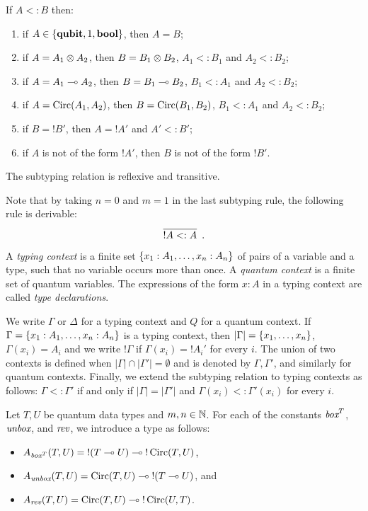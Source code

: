 \documentclass[twoside]{article}
\begin{document}
\begin{remark}
\label{subtyping_shape}
If $A<:B$ then:
\begin{enumerate}
  \item if $A\in\{\textrm{\bf qubit}, 1, \textrm{\bf bool}\}$, then $A=B$;
  \item if $A=A_1\otimes A_2$, then $B=B_1\otimes B_2$, 
  $A_1<:B_1$ and $A_2<:B_2$;
  \item if $A=A_1\multimap A_2$, then $B=B_1\multimap B_2$, 
  $B_1<:A_1$ and $A_2<:B_2$;
  \item if $A=\mathop{\textrm{Circ}}\nolimits(A_1, A_2)$, then $B=\mathop{\textrm{Circ}}\nolimits(B_1,B_2)$, 
  $B_1<:A_1$ and $A_2<:B_2$;
  \item if $B={!}B'$, then $A={!}A'$ and $A'<:B'$;\label{subtype_bang}
  \item if $A$ is not of the form ${!}A'$, then $B$ is not 
  of the form ${!}B'$.
\end{enumerate}
\end{remark}

\begin{proposition}
The subtyping relation is reflexive and transitive.
\end{proposition}

Note that by taking $n=0$ and $m=1$ in the last subtyping rule, the
following rule is derivable:
\[
  \infer[]{{!}A <: A}{}
  .
\]

\begin{definition}
A \emph{typing context} is a finite set 
$\{x_1:A_1,\ldots,x_n:A_n\}$ of pairs of a variable and 
a type, such that no variable occurs more than once. A 
\emph{quantum context} is a finite set of quantum variables. 
The expressions of the form $x:A$ in a typing context are 
called \emph{type declarations}.	
\end{definition}

We write $\Gamma$ or $\Delta$ for a typing context and $Q$ for 
a quantum context. If $\Gamma =\{x_1:A_1,\ldots,x_n:A_n\}$ is 
a typing context, then $|\Gamma|=\{x_1,\ldots,x_n\}$, 
$\Gamma (x_i)=A_i$ and we write ${!}\Gamma$ if $\Gamma(x_i)={!}A_i'$ 
for every $i$. The union of two contexts is defined when
$|\Gamma|\cap  |\Gamma'|=\emptyset$ and is denoted by $\Gamma,\Gamma'$, 
and similarly for quantum contexts. Finally, we extend the subtyping 
relation to typing contexts as follows: $\Gamma <: \Gamma'$ if and 
only if $|\Gamma | = |\Gamma'|$ and $\Gamma (x_i)<: \Gamma' (x_i)$ 
for every $i$.

\begin{definition}
Let $T,U$ be quantum data types and $m,n\in\mathbb{N}$. For each of the constants 
$\mathop{\textit{box}}\nolimits^T$, $\mathop{\textit{unbox}}\nolimits$, and $\mathop{\textit{rev}}\nolimits$, we introduce a type as follows:
\begin{itemize}
  \item $A_{\mathop{\textit{box}}\nolimits^T}(T,U)={!}(T\multimap U)\multimap {!}\mathop{\textrm{Circ}}\nolimits(T,U)$,
  \item $A_{\mathop{\textit{unbox}}\nolimits}(T,U)=\mathop{\textrm{Circ}}\nolimits(T,U)\multimap {!}(T\multimap U)$, and
  \item $A_{\mathop{\textit{rev}}\nolimits}(T,U)=\mathop{\textrm{Circ}}\nolimits(T,U) \multimap {!}\mathop{\textrm{Circ}}\nolimits(U,T)$.
\end{itemize}
\end{definition}
\end{document}

